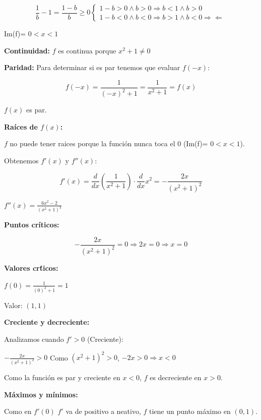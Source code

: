 \documentclass[12pt]{article}
\begin{document}
\begin{enumerate}[\hspace{9px} a)]
        \[\displaystyle\frac{1}{b}-1=\frac{1-b}{b} \geq 0
        \begin{cases*}
            1-b>0 \wedge b>0 \Rightarrow b<1 \wedge b>0\\
            1-b<0 \wedge b<0 \Rightarrow b>1 \wedge b<0 \Rightarrow\!\Leftarrow
        \end{cases*}
        \]

        Im(f)= $0<x<1$

        \textbf{Continuidad:}
        $f$ es continua porque \(x^2+1\neq0\)\medskip

        \textbf{Paridad:}
        Para determinar si es par tenemos que evaluar $f(-x)$:

        \[f(-x)=\displaystyle\frac{1}{(-x)^2+1}= \frac{1}{x^2+1} = f(x)\]
        
        $f(x)$ es par.\medskip

        \textbf{Ra\'ices de $f(x)$:}\medskip
        
        $f$ no puede tener raices porque la funci\'on nunca toca el 0 (Im(f)= $0<x<1$).\medskip

        Obtenemos $f'(x)$ y $f''(x)$:

        \[f'(x) = \displaystyle\frac{d}{dx}\left(\frac{1}{x^2+1}\right)\cdot \frac{d}{dx}x^2 = -\frac{2x}{(x^2+1)^2}\]

        \(f''(x) = \displaystyle\frac{6x^2-2}{(x^2+1)^3}\)\medskip

        \textbf{Puntos cr\'iticos:}\medskip

        \[-\frac{2x}{(x^2+1)^2} = 0 \Rightarrow 2x=0 \Rightarrow x=0\]

        \textbf{Valores cr\'ticos:}

        \(f(0) = \displaystyle\frac{1}{(0)^2+1} = 1\)\medskip
        
        Valor: $(1,1)$\medskip

        \textbf{Creciente y decreciente:}\medskip

        Analizamos cuando $f'>0$ (Creciente):\medskip

        \(-\frac{2x}{(x^2+1)^2}>0\) \quad Como \((x^2+1)^2>0\), $-2x>0 \Rightarrow x<0$ \medskip

        Como la funci\'on es par y creciente en $x<0$, $f$ es decreciente en $x>0$.\medskip

        \textbf{M\'aximos y m\'inimos:}\medskip

        Como en $f'(0)$ $f'$ va de positivo a neativo, $f$ tiene un punto m\'aximo en $(0,1)$.\medskip


\end{enumerate}
\end{document}
